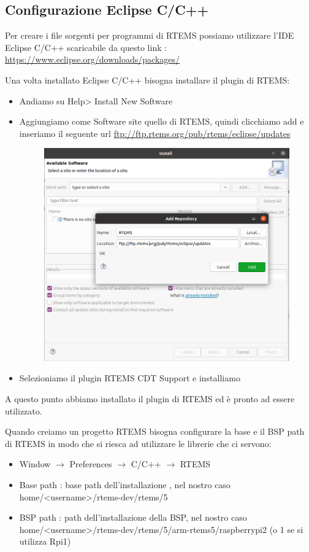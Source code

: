\documentclass[12pt, a4paper]{article}
\begin{document}
\begin{flushleft}
\newpage
\section{Configurazione Eclipse C/C++} 
Per creare i file sorgenti per programmi di RTEMS possiamo utilizzare l'IDE Eclipse C/C++ scaricabile da questo link :
\url{https://www.eclipse.org/downloads/packages/}


Una volta installato Eclipse C/C++ bisogna installare il plugin di RTEMS:
\begin{itemize}
\item Andiamo su Help> Install New Software
\item Aggiungiamo come Software site quello di RTEMS, quindi clicchiamo add e inseriamo il seguente url \url{ftp://ftp.rtems.org/pub/rtems/eclipse/updates}
\begin{figure}[h!]
\includegraphics[width=\linewidth]{ftp-rtems-eclipse.png}
\end{figure}
\item Selezioniamo il plugin RTEMS CDT Support e installiamo
\end{itemize}

A questo punto abbiamo installato il plugin di RTEMS ed è pronto ad essere utilizzato.

\newpage

Quando creiamo un progetto RTEMS bisogna configurare la base e il BSP path di RTEMS in modo che si riesca ad utilizzare le librerie che ci servono:
\begin{itemize}
\item Window $\rightarrow$ Preferences $\rightarrow$ C/C++ $\rightarrow$ RTEMS
\item Base path : base path dell'installazione , nel nostro caso home/<username>/rtems-dev/rtems/5
\item BSP path : path dell'installazione della BSP, nel nostro caso home/<username>/rtems-dev/rtems/5/arm-rtems5/raspberrypi2 (o 1 se si utilizza Rpi1)
\end{itemize}


\end{flushleft}
\end{document}
